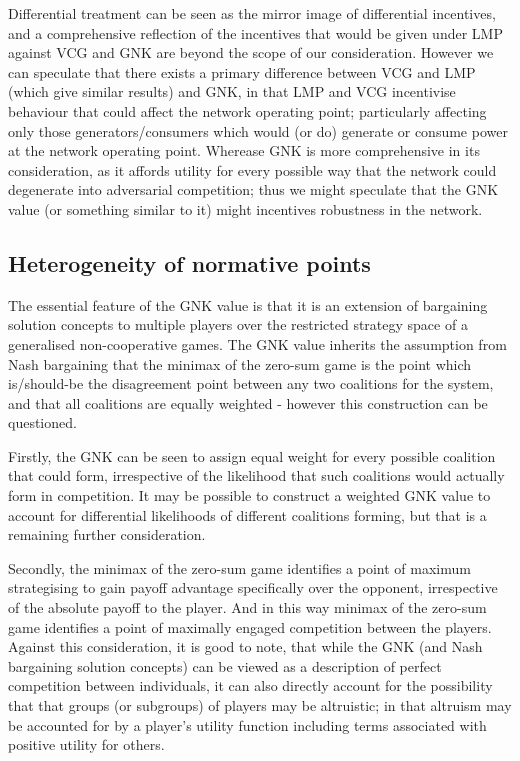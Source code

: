Differential treatment can be seen as the mirror image of differential incentives, and a comprehensive reflection of the incentives that would be given under LMP against VCG and GNK are beyond the scope of our consideration.
However we can speculate that there exists a primary difference between VCG and LMP (which give similar results) and GNK, in that LMP and VCG incentivise behaviour that could affect the network operating point; particularly affecting only those generators/consumers which would (or do) generate or consume power at the network operating point.
Wherease GNK is more comprehensive in its consideration, as it affords utility for every possible way that the network could degenerate into adversarial competition; thus we might speculate that the GNK value (or something similar to it) might incentives robustness in the network.

\subsection{Heterogeneity of normative points}

The essential feature of the GNK value is that it is an extension of bargaining solution concepts to multiple players over the restricted strategy space of a generalised non-cooperative games.
The GNK value inherits the assumption from Nash bargaining that the minimax of the zero-sum game is the point which is/should-be the disagreement point between any two coalitions for the system, and that all coalitions are equally weighted - however this construction can be questioned.

Firstly, the GNK can be seen to assign equal weight for every possible coalition that could form, irrespective of the likelihood that such coalitions would actually form in competition.
It may be possible to construct a weighted GNK value to account for differential likelihoods of different coalitions forming, but that is a remaining further consideration.

Secondly, the minimax of the zero-sum game identifies a point of maximum strategising to gain payoff advantage specifically over the opponent, irrespective of the absolute payoff to the player.
And in this way minimax of the zero-sum game identifies a point of maximally engaged competition between the players.
Against this consideration, it is good to note, that while the GNK (and Nash bargaining solution concepts) can be viewed as a description of perfect competition between individuals, it can also directly account for the possibility that that groups (or subgroups) of players may be altruistic; in that altruism may be accounted for by a player's utility function including terms associated with positive utility for others.

